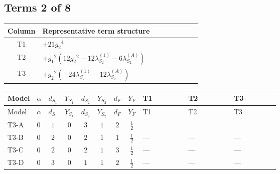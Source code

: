 \documentclass[8pt]{article}
\begin{document}
\begin{landscape}
\subsection*{Terms 2 of 8}
\begin{center}
\begin{tabular}{@{}c >{\raggedright\arraybackslash}p{0.82\linewidth}@{}}
\toprule
Column & Representative term structure \\
\midrule
T1 & \(\displaystyle +21 {g_2}^4\) \\
\midrule
T2 & \(\displaystyle +{g_1}^2 \left(12 {g_2}^2-12 {\lambda_{S_2}^{(1)}}-6 {\lambda_{S_2}^{(A)}}\right)\) \\
\midrule
T3 & \(\displaystyle +{g_2}^2 (-24 {\lambda_{S_2}^{(1)}}-12 {\lambda_{S_2}^{(A)}})\) \\
\midrule
\bottomrule
\end{tabular}
\end{center}
\smallskip
\tiny
\begin{longtable}{@{}llcccccc >{\raggedright\arraybackslash}p{0.21\linewidth} >{\raggedright\arraybackslash}p{0.21\linewidth} >{\raggedright\arraybackslash}p{0.21\linewidth}@{}}
\toprule
Model & $\alpha$ & $d_{S_1}$ & $Y_{S_1}$ & $d_{S_2}$ & $Y_{S_2}$ & $d_F$ & $Y_F$ & T1 & T2 & T3 \\
\midrule
\endfirsthead
\toprule
Model & $\alpha$ & $d_{S_1}$ & $Y_{S_1}$ & $d_{S_2}$ & $Y_{S_2}$ & $d_F$ & $Y_F$ & T1 & T2 & T3 \\
\midrule
\endhead
T3-A & $0$ & $1$ & $0$ & $3$ & $1$ & $2$ & $\frac{1}{2}$ & \scriptsize\adjustbox{max width=\linewidth}{$\begin{gathered} +21 {g_2}^4\end{gathered}$} & \scriptsize\adjustbox{max width=\linewidth}{$\begin{gathered} +{g_1}^2 \left(12 {g_2}^2-12 {\lambda_{S_2}^{(1)}}-6 {\lambda_{S_2}^{(A)}}\right)\end{gathered}$} & \scriptsize\adjustbox{max width=\linewidth}{$\begin{gathered} +{g_2}^2 (-24 {\lambda_{S_2}^{(1)}}-12 {\lambda_{S_2}^{(A)}})\end{gathered}$} \\
\midrule
T3-B & $0$ & $2$ & $0$ & $2$ & $1$ & $1$ & $\frac{1}{2}$ & --- & --- & --- \\
\midrule
T3-C & $0$ & $2$ & $0$ & $2$ & $1$ & $3$ & $\frac{1}{2}$ & --- & --- & --- \\
\midrule
T3-D & $0$ & $3$ & $0$ & $1$ & $1$ & $2$ & $\frac{1}{2}$ & --- & --- & --- \\

\end{longtable}
\end{landscape}
\end{document}
